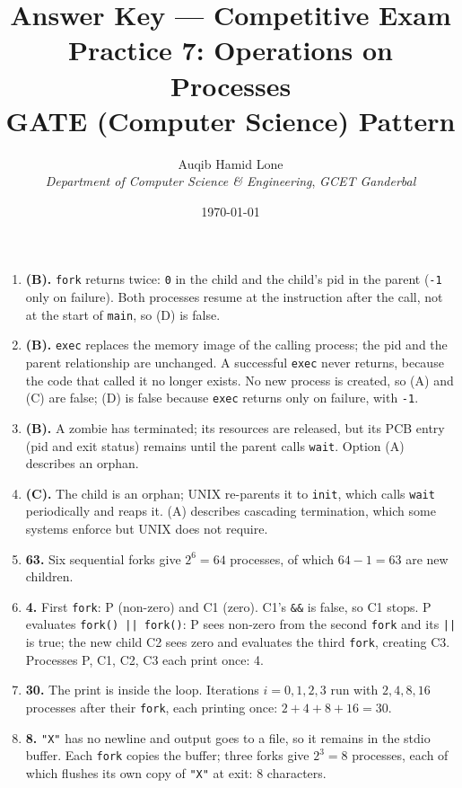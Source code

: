 \documentclass[11pt]{article}
\title{Answer Key --- Competitive Exam Practice 7: Operations on Processes\\\large GATE (Computer Science) Pattern}
\author{Auqib Hamid Lone\\[0.3em]
  \emph{Department of Computer Science \& Engineering}, \emph{GCET Ganderbal}}
\date{\today}
\begin{document}
\maketitle

\begin{enumerate}
\item[\textbf{Q1}] \textbf{(B).} \texttt{fork} returns twice: \texttt{0} in the child and the child's pid in the parent (\texttt{-1} only on failure). Both processes resume at the instruction after the call, not at the start of \texttt{main}, so (D) is false.

\item[\textbf{Q2}] \textbf{(B).} \texttt{exec} replaces the memory image of the calling process; the pid and the parent relationship are unchanged. A successful \texttt{exec} never returns, because the code that called it no longer exists. No new process is created, so (A) and (C) are false; (D) is false because \texttt{exec} returns only on failure, with \texttt{-1}.

\item[\textbf{Q3}] \textbf{(B).} A zombie has terminated; its resources are released, but its PCB entry (pid and exit status) remains until the parent calls \texttt{wait}. Option (A) describes an orphan.

\item[\textbf{Q4}] \textbf{(C).} The child is an orphan; UNIX re-parents it to \texttt{init}, which calls \texttt{wait} periodically and reaps it. (A) describes cascading termination, which some systems enforce but UNIX does not require.

\item[\textbf{Q5}] \textbf{63.} Six sequential forks give $2^6 = 64$ processes, of which $64 - 1 = 63$ are new children.

\item[\textbf{Q6}] \textbf{4.} First \texttt{fork}: P (non-zero) and C1 (zero). C1's \texttt{\&\&} is false, so C1 stops. P evaluates \texttt{fork() || fork()}: P sees non-zero from the second \texttt{fork} and its \texttt{||} is true; the new child C2 sees zero and evaluates the third \texttt{fork}, creating C3. Processes P, C1, C2, C3 each print once: 4.

\item[\textbf{Q7}] \textbf{30.} The print is inside the loop. Iterations $i = 0, 1, 2, 3$ run with $2, 4, 8, 16$ processes after their \texttt{fork}, each printing once: $2 + 4 + 8 + 16 = 30$.

\item[\textbf{Q8}] \textbf{8.} \texttt{"X"} has no newline and output goes to a file, so it remains in the stdio buffer. Each \texttt{fork} copies the buffer; three forks give $2^3 = 8$ processes, each of which flushes its own copy of \texttt{"X"} at exit: 8 characters.


\end{enumerate}
\end{document}
